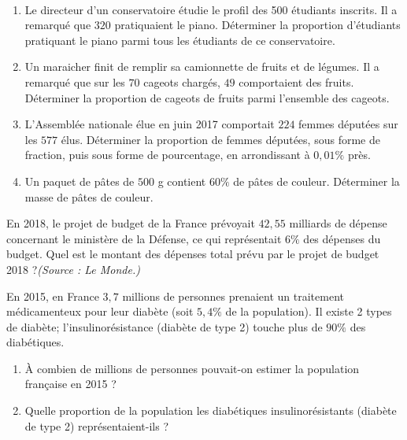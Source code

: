 \documentclass[11pt]{article}
\begin{document}
\begin{exo}~
 \begin{enumerate}
  \item Le directeur d’un conservatoire étudie le profil des 500 étudiants
    inscrits. Il a remarqué que $320$ pratiquaient le piano. Déterminer la
    proportion d’étudiants pratiquant le piano parmi tous les étudiants de ce
    conservatoire.
  \item Un maraicher finit de remplir sa camionnette de fruits et de légumes. Il
    a remarqué que sur les $70$ cageots chargés, $49$ comportaient des fruits.
    Déterminer la proportion de cageots de fruits parmi l’ensemble des cageots.
  \item L’Assemblée nationale élue en juin 2017 comportait $224$ femmes députées
    sur les $577$ élus. Déterminer la proportion de femmes députées, sous forme
    de fraction, puis sous forme de pourcentage, en arrondissant à $0,01\%$ près.
  \item Un paquet de pâtes de $500$ g contient $60\%$ de pâtes de
    couleur. Déterminer la masse de pâtes de couleur.
\end{enumerate}
\end{exo}

\begin{exo}
En 2018, le projet de budget de la France prévoyait
$42,55$ milliards de dépense concernant le ministère de la Défense, ce qui
représentait $6\%$ des dépenses du budget. Quel est le montant des dépenses
total prévu par le projet de budget 2018 ?\hfill\emph{(Source : Le Monde.)}
\end{exo}

\begin{exo}
En 2015, en France $3,7$ millions de personnes prenaient
un traitement médicamenteux pour leur diabète (soit $5,4\%$ de la population).
Il existe 2 types de diabète; l’insulinorésistance (diabète de type 2) touche
plus de $90\%$ des diabétiques.
\begin{enumerate}
  \item À combien de millions de personnes pouvait-on estimer la population
    française en 2015 ?
  \item Quelle proportion de la population les diabétiques insulinorésistants
    (diabète de type 2) représentaient-ils ?
\end{enumerate}
\end{exo}
\end{document}
